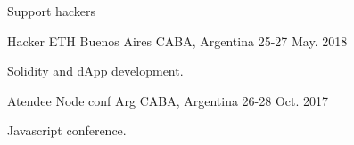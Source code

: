 \begin{cventries}
{\begin{cvitems}
\item {Support hackers}
\end{cvitems}
}
\cventry
{Hacker} %
{ETH Buenos Aires} %
{CABA, Argentina} %
{25-27 May. 2018} %
{ %
\begin{cvitems}
\item {Solidity and dApp development.}
\end{cvitems}
}
\cventry
{Atendee} %
{Node conf Arg} %
{CABA, Argentina} %
{26-28 Oct. 2017} %
{ %
\begin{cvitems}
\item {Javascript conference.}
\end{cvitems}
}
\end{cventries}

